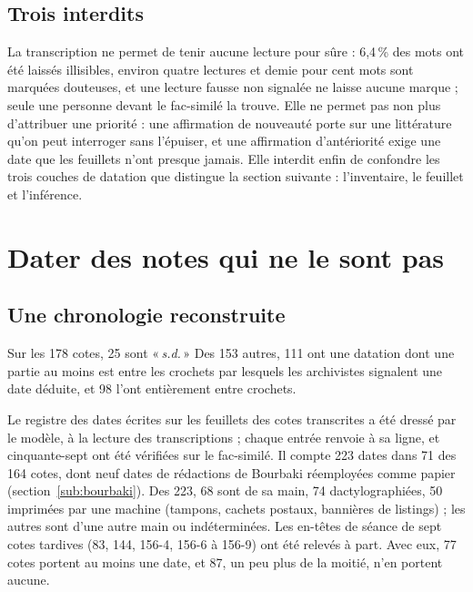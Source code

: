 \documentclass[11pt]{amsart}
\newcommand{\q}[1]{«\,\textit{#1}\,»}
\begin{document}
\subsection{Trois interdits}

La transcription ne permet de tenir aucune lecture pour sûre : 6,4\,\% des mots ont été laissés illisibles, environ quatre lectures et demie pour cent mots sont marquées douteuses, et une lecture fausse non signalée ne laisse aucune marque ; seule une personne devant le fac-similé la trouve. Elle ne permet pas non plus d'attribuer une priorité : une affirmation de nouveauté porte sur une littérature qu'on peut interroger sans l'épuiser, et une affirmation d'antériorité exige une date que les feuillets n'ont presque jamais. Elle interdit enfin de confondre les trois couches de datation que distingue la section suivante : l'inventaire, le feuillet et l'inférence.

\section{Dater des notes qui ne le sont pas}\label{sec:chrono}

\subsection{Une chronologie reconstruite}

Sur les 178 cotes, 25 sont \q{s.d.} Des 153 autres, 111 ont une datation dont une partie au moins est entre les crochets par lesquels les archivistes signalent une date déduite, et 98 l'ont entièrement entre crochets.

Le registre des dates écrites sur les feuillets des cotes transcrites a été dressé par le modèle, à la lecture des transcriptions ; chaque entrée renvoie à sa ligne, et cinquante-sept ont été vérifiées sur le fac-similé. Il compte 223 dates dans 71 des 164 cotes, dont neuf dates de rédactions de Bourbaki réemployées comme papier (section~\ref{sub:bourbaki}). Des 223, 68 sont de sa main, 74 dactylographiées, 50 imprimées par une machine (tampons, cachets postaux, bannières de listings) ; les autres sont d'une autre main ou indéterminées. Les en-têtes de séance de sept cotes tardives (83, 144, 156-4, 156-6 à 156-9) ont été relevés à part. Avec eux, 77 cotes portent au moins une date, et 87, un peu plus de la moitié, n'en portent aucune.
\end{document}

